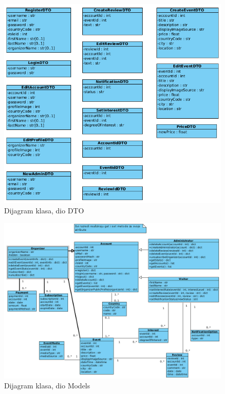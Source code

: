 			\newpage

			\begin{figure}[htbp]
				\centering
				\includegraphics[width=1\textwidth]{dijagrami/dijagram_mvc_dto.png}
				\caption{Dijagram klasa, dio DTO}
			\label{fig:my_image}
			\end{figure}

			\newpage

			\begin{figure}[htbp]
				\centering
				\includegraphics[width=1\textwidth]{dijagrami/dijagram_mvc_models.png}
				\caption{Dijagram klasa, dio Models}
			\label{fig:my_image}
			\end{figure}


